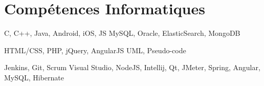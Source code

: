 \section{Compétences Informatiques}
	\begin{minipage}{\textwidth}
		\begin{minipage}{\textwidth}
			{C, C++, Java, Android, iOS, JS}
			{MySQL, Oracle, ElasticSearch, MongoDB}
		\end{minipage}
		
		\smallskip
		\begin{minipage}{\textwidth}
			\smallskip
			{HTML/CSS, PHP, jQuery, AngularJS}
			{UML, Pseudo-code}
		\end{minipage}
	
		\smallskip
		\begin{minipage}{\textwidth}
			\smallskip
			{Jenkins, Git, Scrum}
			{Visual Studio, NodeJS, Intellij, Qt, JMeter, Spring, Angular, MySQL,
			Hibernate} %
		\end{minipage}
	\end{minipage}



